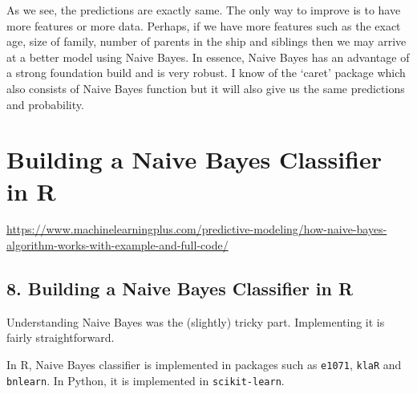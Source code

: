\documentclass[]{book}
\newenvironment{Shaded}{\begin{snugshade}}{\end{snugshade}}
\newcommand{\CommentTok}[1]{\textcolor[rgb]{0.56,0.35,0.01}{\textit{#1}}}
\newcommand{\DataTypeTok}[1]{\textcolor[rgb]{0.13,0.29,0.53}{#1}}
\newcommand{\DecValTok}[1]{\textcolor[rgb]{0.00,0.00,0.81}{#1}}
\newcommand{\KeywordTok}[1]{\textcolor[rgb]{0.13,0.29,0.53}{\textbf{#1}}}
\newcommand{\NormalTok}[1]{#1}
\newcommand{\OperatorTok}[1]{\textcolor[rgb]{0.81,0.36,0.00}{\textbf{#1}}}
\newcommand{\StringTok}[1]{\textcolor[rgb]{0.31,0.60,0.02}{#1}}
\begin{document}
\begin{Shaded}
\end{Shaded}

As we see, the predictions are exactly same. The only way to improve is to have more features or more data. Perhaps, if we have more features such as the exact age, size of family, number of parents in the ship and siblings then we may arrive at a better model using Naive Bayes. In essence, Naive Bayes has an advantage of a strong foundation build and is very robust. I know of the `caret' package which also consists of Naive Bayes function but it will also give us the same predictions and probability.

\hypertarget{building-a-naive-bayes-classifier-in-r}{%
\chapter{Building a Naive Bayes Classifier in R}\label{building-a-naive-bayes-classifier-in-r}}

\url{https://www.machinelearningplus.com/predictive-modeling/how-naive-bayes-algorithm-works-with-example-and-full-code/}

\hypertarget{building-a-naive-bayes-classifier-in-r-1}{%
\section{8. Building a Naive Bayes Classifier in R}\label{building-a-naive-bayes-classifier-in-r-1}}

Understanding Naive Bayes was the (slightly) tricky part. Implementing it is fairly straightforward.

In R, Naive Bayes classifier is implemented in packages such as \texttt{e1071}, \texttt{klaR} and \texttt{bnlearn}. In Python, it is implemented in \texttt{scikit-learn}.
\end{document}
